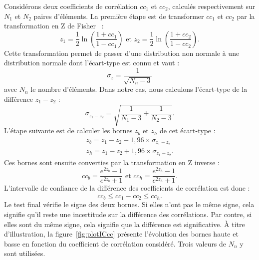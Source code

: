 Considérons deux coefficients de corrélation $\mathit{cc}_1$ et $\mathit{cc}_2$, calculés respectivement sur $N_1$ et $N_2$ paires d'éléments. La première étape est de transformer $\mathit{cc}_1$ et $\mathit{cc}_2$ par la transformation en Z de Fisher~\cite{fisher-z} :
\begin{equation}
z_1 = \frac{1}{2} \ln\left(\frac{1+\mathit{cc}_1}{1-\mathit{cc}_1}\right) \text{ et } z_2 = \frac{1}{2} \ln\left(\frac{1+\mathit{cc}_2}{1-\mathit{cc}_2}\right).
\end{equation}
%
Cette transformation permet de passer d'une distribution non normale à une distribution normale dont l'écart-type est connu et vaut :
\begin{equation}
\sigma_z = \frac{1}{\sqrt{N_n-3}}
\end{equation}
%
avec $N_n$ le nombre d'éléments. Dans notre cas, nous calculons l'écart-type de la différence $z_1-z_2$ :
\begin{equation}
\sigma_{z_1-z_2} = \sqrt{\frac{1}{N_1-3} +\frac{1}{N_2-3}}.
\end{equation}
%
L'étape suivante est de calculer les bornes $z_b$ et $z_h$ de cet écart-type :
\begin{equation}
\begin{array}{c}
z_b = z_1-z_2 - 1,96\times \sigma_{z_1-z_2}\\
z_h = z_1-z_2 + 1,96\times \sigma_{z_1-z_2}.
\end{array}
\end{equation}
%
Ces bornes sont ensuite converties par la transformation en Z inverse :
\begin{equation}
\mathit{cc}_b = \frac{e^{2z_b}-1}{e^{2z_b}+1} \text{ et } \mathit{cc}_h = \frac{e^{2z_h}-1}{e^{2z_h}+1}.
\end{equation}
%
L'intervalle de confiance de la différence des coefficients de corrélation est donc :
\begin{equation}
\mathit{cc}_b \leqslant \mathit{cc}_1 - \mathit{cc}_2 \leqslant \mathit{cc}_h.
\end{equation}
%
Le test final vérifie le signe des deux bornes. Si elles n'ont pas le même signe, cela signifie qu'il reste une incertitude sur la différence des corrélations. Par contre, si elles sont du même signe, cela signifie que la différence est significative. À titre d'illustration, la figure~\ref{fig:plotICcc} présente l'évolution des bornes haute et basse en fonction du coefficient de corrélation considéré. Trois valeurs de $N_n$ y sont utilisées.

